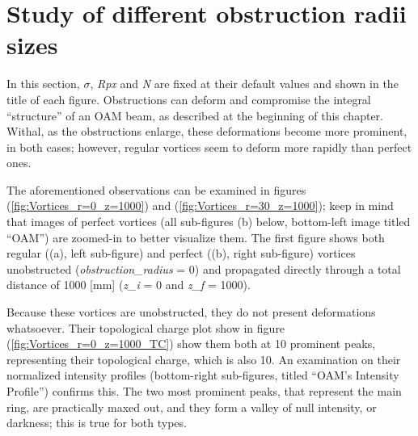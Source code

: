 \section{Study of different obstruction radii sizes}
\label{c4: radii size variations}

In this section, $\sigma$, \textit{Rpx} and \textit{N} are fixed at their default values and shown in the title of each figure. Obstructions can deform and compromise the integral ``structure'' of an OAM beam, as described at the beginning of this chapter. Withal, as the obstructions enlarge, these deformations become more prominent, in both cases; however, regular vortices seem to deform more rapidly than perfect ones. 

The aforementioned observations can be examined in figures (\ref{fig:Vortices_r=0_z=1000}) and (\ref{fig:Vortices_r=30_z=1000}); keep in mind that images of perfect vortices (all sub-figures (b) below, bottom-left image titled ``OAM'') are zoomed-in to better visualize them. The first figure shows both regular ((a), left sub-figure) and perfect ((b), right sub-figure) vortices unobstructed (\textit{obstruction\_radius} = 0) and propagated directly through a total distance of 1000 [mm] (\textit{z\_i} = 0 and \textit{z\_f} = 1000). 

Because these vortices are unobstructed, they do not present deformations whatsoever. Their topological charge plot show in figure (\ref{fig:Vortices_r=0_z=1000_TC}) show them both at 10 prominent peaks, representing their topological charge, which is also 10. An examination on their normalized intensity profiles (bottom-right sub-figures, titled ``OAM's Intensity Profile'') confirms this. The two most prominent peaks, that represent the main ring, are practically maxed out, and they form a valley of null intensity, or darkness; this is true for both types.

